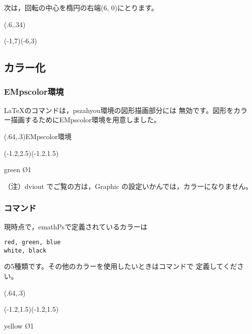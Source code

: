 \documentclass[a4j]{jarticle}
\begin{document}
次は，回転の中心を楕円の右端(6, 0)にとります。

\begin{showEx}(.6,.34){}
\begin{pszahyou}[ul=5mm](-1,7)(-6,3)
  \EPSkaiten{}
  \Daen{}
  \kTyokusen{}
  \kTyokusen{}
\end{pszahyou}
\end{showEx}

\subsection{カラー化}
\subsubsection{\textsf{EMpscolor}環境}
\LaTeX のコマンドは，\textsf{pszahyou}環境の図形描画部分には
無効です。図形をカラー描画するために\textsf{EMpscolor}環境を用意しました。

\begin{showEx}(.64,.3){\textsf{EMpscolor}環境}
  \begin{pszahyou}[ul=10mm](-1.2,2.5)(-1.2,1.5)
    \begin{EMpscolor}{green}
      \En\O{1}
    \end{EMpscolor}
  \end{pszahyou}
\end{showEx}

（注）dviout でご覧の方は，Graphic の設定いかんでは，カラーになりません。

\subsubsection{\texorpdfstring{}{defineEMpscolor}コマンド}
現時点で，\textsf{emathPs}で定義されているカラーは
\begin{jquote}
\begin{verbatim}
red, green, blue
white, black
\end{verbatim}
\end{jquote}
の5種類です。その他のカラーを使用したいときはコマンドで
定義してください。

\begin{showEx}(.64,.3){}
  \begin{pszahyou}[ul=10mm](-1.2,1.5)(-1.2,1.5)
    \begin{EMpscolor}{yellow}
      \En\O{1}
    \end{EMpscolor}
  \end{pszahyou}
\end{showEx}
\end{document}
